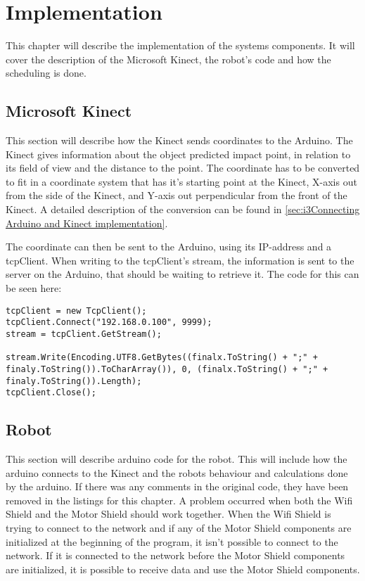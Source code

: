 \chapter{Implementation}
\label{chap:Implementation}
This chapter will describe the implementation of the systems components. It will cover the description of the Microsoft Kinect, the robot's code and how the scheduling is done. 

\section{Microsoft Kinect}
\label{sec:Microsoft Kinect Implementation}
This section will describe how the Kinect sends coordinates to the Arduino.
The Kinect gives information about the object predicted impact point, in relation to its field of view and the distance to the point. The coordinate has to be converted to fit in a coordinate system that has it’s starting point at the Kinect, X-axis out from the side of the Kinect, and Y-axis out perpendicular from the front of the Kinect. \newline	
A detailed description of the conversion can be found in \ref{sec:i3Connecting Arduino and Kinect implementation}.

The coordinate can then be sent to the Arduino, using its IP-address and a tcpClient. 
When writing to the tcpClient’s stream, the information is sent to the server on the Arduino, that should be waiting to retrieve it.
The code for this can be seen here:

\begin{lstlisting}[caption={Sending data to the Arduino}, label={sendData}]
tcpClient = new TcpClient();
tcpClient.Connect("192.168.0.100", 9999);
stream = tcpClient.GetStream();

stream.Write(Encoding.UTF8.GetBytes((finalx.ToString() + ";" + finaly.ToString()).ToCharArray()), 0, (finalx.ToString() + ";" + finaly.ToString()).Length);
tcpClient.Close();
\end{lstlisting}


\section{Robot}
\label{sec:Robot}
This section will describe arduino code for the robot. This will include how the arduino connects to the Kinect and the robots behaviour and calculations done by the arduino. If there was any comments in the original code, they have been removed in the listings for this chapter. \newline
A problem occurred when both the Wifi Shield and the Motor Shield should work together. When the Wifi Shield is trying to connect to the network and if any of the Motor Shield components are initialized at the beginning of the program, it isn't possible to connect to the network. If it is connected to the network before the Motor Shield components are initialized, it is possible to receive data and use the Motor Shield components.

